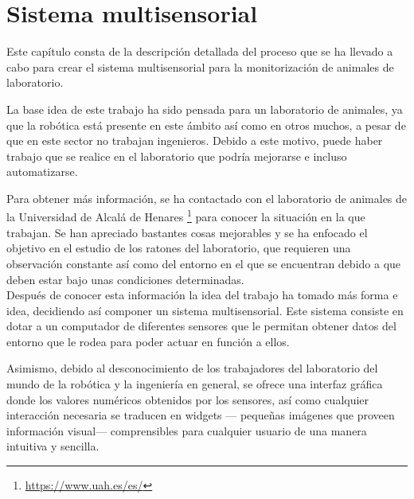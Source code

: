 \chapter{Sistema multisensorial }
\label{cap:capitulo4}



\vspace{1cm}
Este capítulo consta de la descripción detallada del proceso que se ha llevado a cabo para crear el sistema multisensorial para la monitorización de animales de laboratorio. 

La base idea de este trabajo ha sido pensada para un laboratorio de animales, ya que la robótica está presente en este ámbito así como en otros muchos, a pesar de que en este sector no trabajan ingenieros. Debido a este motivo, puede haber trabajo que se realice en el laboratorio que podría mejorarse e incluso automatizarse. 

Para obtener más información, se ha contactado con el laboratorio de animales de la Universidad de Alcalá de Henares \footnote{\url{https://www.uah.es/es/}}  para conocer la situación en la que trabajan. Se han apreciado bastantes cosas mejorables y se ha enfocado el objetivo en el estudio de los ratones del laboratorio, que requieren una observación constante así como del entorno en el que se encuentran debido a que deben estar bajo unas condiciones determinadas.\\

Después de conocer esta información la idea del trabajo ha tomado más forma e idea, decidiendo así componer un sistema multisensorial. Este sistema consiste en dotar a un computador de diferentes sensores que le permitan obtener datos del entorno que le rodea para poder actuar en función a ellos. 

Asimismo, debido al desconocimiento de los trabajadores del laboratorio del mundo de la robótica y la ingeniería en general, se ofrece una interfaz gráfica donde los valores numéricos obtenidos por los sensores, así como cualquier interacción necesaria se traducen en widgets --- pequeñas imágenes que proveen información visual--- comprensibles para cualquier usuario de una manera intuitiva y sencilla.\\

